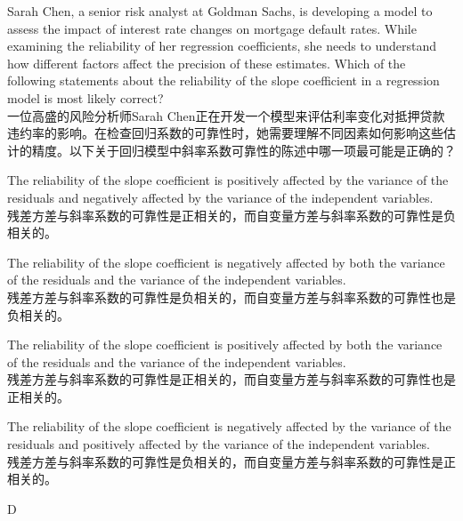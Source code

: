 \documentclass{article}
\newcounter{question} %
\begin{document}
\begin{question}
Sarah Chen, a senior risk analyst at Goldman Sachs, is developing a model to assess the impact of interest rate changes on mortgage default rates. While examining the reliability of her regression coefficients, she needs to understand how different factors affect the precision of these estimates. Which of the following statements about the reliability of the slope coefficient in a regression model is most likely correct?\\  
一位高盛的风险分析师Sarah Chen正在开发一个模型来评估利率变化对抵押贷款违约率的影响。在检查回归系数的可靠性时，她需要理解不同因素如何影响这些估计的精度。以下关于回归模型中斜率系数可靠性的陈述中哪一项最可能是正确的？
\end{question}
\begin{choices}
    \item The reliability of the slope coefficient is positively affected by the variance of the residuals and negatively affected by the variance of the independent variables.\\
    残差方差与斜率系数的可靠性是正相关的，而自变量方差与斜率系数的可靠性是负相关的。
    \item The reliability of the slope coefficient is negatively affected by both the variance of the residuals and the variance of the independent variables.\\
    残差方差与斜率系数的可靠性是负相关的，而自变量方差与斜率系数的可靠性也是负相关的。
    \item The reliability of the slope coefficient is positively affected by both the variance of the residuals and the variance of the independent variables.\\
    残差方差与斜率系数的可靠性是正相关的，而自变量方差与斜率系数的可靠性也是正相关的。
    \item The reliability of the slope coefficient is negatively affected by the variance of the residuals and positively affected by the variance of the independent variables.\\
    残差方差与斜率系数的可靠性是负相关的，而自变量方差与斜率系数的可靠性是正相关的。
\end{choices}

\begin{correctanswer}
D
\end{correctanswer}
\end{document}
